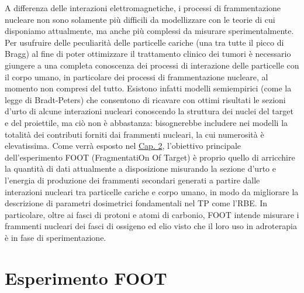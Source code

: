\documentclass[12pt,a4paper,twoside]{report}
\begin{document}
	A differenza delle interazioni elettromagnetiche, i processi di frammentazione nucleare non sono solamente più difficili da modellizzare con le teorie di cui disponiamo attualmente, ma anche più complessi da misurare sperimentalmente. Per usufruire delle peculiarità delle particelle cariche (una tra tutte il picco di Bragg) al fine di poter ottimizzare il trattamento clinico dei tumori è necessario giungere a una completa conoscenza dei processi di interazione delle particelle con il corpo umano, in particolare dei processi di frammentazione nucleare, al momento non compresi del tutto. Esistono infatti modelli semiempirici (come la legge di Bradt-Peters) che consentono di ricavare con ottimi risultati le sezioni d'urto di alcune interazioni nucleari conoscendo la struttura dei nuclei del target e del proiettile, ma ciò non è abbastanza: bisognerebbe includere nei modelli la totalità dei contributi forniti dai frammenti nucleari, la cui numerosità è elevatissima. Come verrà esposto nel \hyperref[cap:2]{Cap. 2}, l'obiettivo principale dell'esperimento FOOT (FragmentatiOn Of Target) è proprio quello di arricchire la quantità di dati attualmente a disposizione misurando la sezione d'urto e l'energia di produzione dei frammenti secondari generati a partire dalle interazioni nucleari tra particelle cariche e corpo umano, in modo da migliorare la descrizione di parametri dosimetrici fondamentali nel TP come l'RBE. In particolare, oltre ai fasci di protoni e atomi di carbonio, FOOT intende misurare i frammenti nucleari dei fasci di ossigeno ed elio visto che il loro uso in adroterapia è in fase di sperimentazione.
	
	\chapter{Esperimento FOOT}
	
	
	
	
	
	
	
	
	
\end{document}
